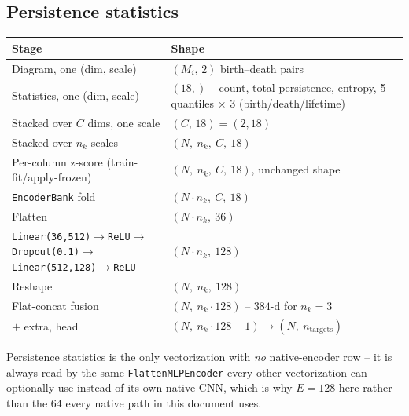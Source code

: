 \documentclass[11pt]{article}
\newcommand{\Nb}{N}
\newcommand{\nk}{n_k}
\begin{document}
\subsection{Persistence statistics}
\begin{center}
\begin{tabular}{@{}p{6.6cm}p{8.6cm}@{}}
\toprule
Stage & Shape \\
\midrule
Diagram, one (dim, scale) & $(M_i,\,2)$ birth--death pairs \\
Statistics, one (dim, scale) & $(18,)$ -- count, total persistence, entropy, 5 quantiles $\times$ 3 (birth/death/lifetime) \\
Stacked over $C$ dims, one scale & $(C,\,18) = (2,18)$ \\
Stacked over $\nk$ scales & $(\Nb,\ \nk,\ C,\ 18)$ \\
Per-column z-score (train-fit/apply-frozen) & $(\Nb,\ \nk,\ C,\ 18)$, unchanged shape \\
\texttt{EncoderBank} fold & $(\Nb\!\cdot\!\nk,\ C,\ 18)$ \\
Flatten & $(\Nb\!\cdot\!\nk,\ 36)$ \\
\texttt{Linear(36,512)}$\to$\texttt{ReLU}$\to$\texttt{Dropout(0.1)}$\to$\texttt{Linear(512,128)}$\to$\texttt{ReLU} & $(\Nb\!\cdot\!\nk,\ 128)$ \\
Reshape & $(\Nb,\ \nk,\ 128)$ \\
Flat-concat fusion & $(\Nb,\ \nk\!\cdot\!128)$ -- $384$-d for $\nk{=}3$ \\
$+$ extra, head & $(\Nb,\ \nk\!\cdot\!128+1) \to (\Nb,\ n_{\mathrm{targets}})$ \\
\bottomrule
\end{tabular}
\end{center}
Persistence statistics is the only vectorization with \emph{no} native-encoder row --
it is always read by the same \texttt{FlattenMLPEncoder} every other vectorization can
optionally use instead of its own native CNN, which is why $E=128$ here rather than
the $64$ every native path in this document uses.
\end{document}
